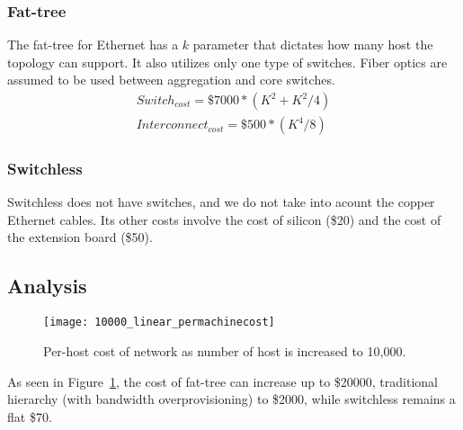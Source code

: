 \subsubsection{Fat-tree}
The fat-tree for Ethernet has a $k$ parameter that dictates how many host the topology can support. It also utilizes only one type of switches. Fiber optics are assumed to be used between aggregation and core switches.
\vspace{-0.1in}
\begin{align}
Switch_{cost} = \$7000 * (K^2 + K^2 / 4) \\
Interconnect_{cost} = \$500 * (K^4 / 8)
\end{align}
\subsubsection{Switchless}
Switchless does not have switches, and we do not take into acount the copper Ethernet cables. Its other costs involve the cost of silicon (\$20) and the cost of the extension board (\$50).

\subsection{Analysis}

\captionsetup[subfloat]{captionskip=-0.003in}
\begin{figure}
    \centering
    \texttt{[image: 10000\_linear\_permachinecost]}
    \vspace{-0.1in}
    \caption{Per-host cost of network as number of host is increased to 10,000.}
    \label{fig:cost_perhost}
\end{figure}

As seen in Figure~\ref{fig:cost_perhost}, the cost of fat-tree can increase up to \$20000, traditional hierarchy (with bandwidth overprovisioning) to \$2000, while switchless remains a flat \$70.

